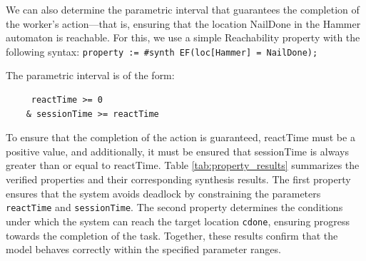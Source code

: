 We can also determine the parametric interval that guarantees the completion of the worker's action—that is, ensuring that the location NailDone in the Hammer automaton is reachable. For this, we use a simple Reachability property with the following syntax: \texttt{property := \#synth EF(loc[Hammer] = NailDone);}

The parametric interval is of the form:

\begin{verbatim}
     reactTime >= 0
    & sessionTime >= reactTime
\end{verbatim}

To ensure that the completion of the action is guaranteed, reactTime must be a positive value, and additionally, it must be ensured that sessionTime is always greater than or equal to reactTime. Table \ref{tab:property_results} summarizes the verified properties and their corresponding synthesis results. The first property ensures that the system avoids deadlock by constraining the parameters \texttt{reactTime} and \texttt{sessionTime}. The second property determines the conditions under which the system can reach the target location \texttt{cdone}, ensuring progress towards the completion of the task. Together, these results confirm that the model behaves correctly within the specified parameter ranges.


\begin{table}[h!]
\centering
{}
\caption{Synthesis of properties and corresponding results.}
\label{tab:property_results}
\end{table}


